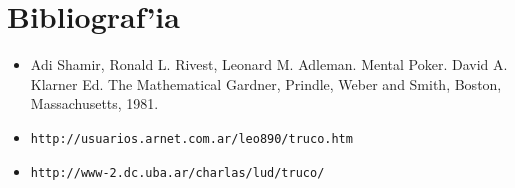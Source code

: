 \section{Bibliograf'ia}
\begin{itemize}
\item Adi Shamir, Ronald L. Rivest, Leonard M. Adleman. Mental Poker. David A. Klarner Ed. The Mathematical Gardner, Prindle, Weber and Smith, Boston, Massachusetts, 1981.

\item \verb|http://usuarios.arnet.com.ar/leo890/truco.htm|

\item \verb|http://www-2.dc.uba.ar/charlas/lud/truco/|
\end{itemize}
